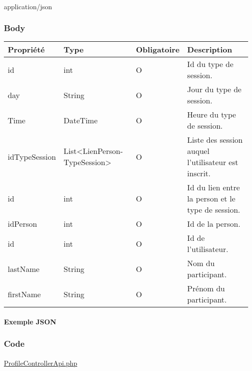 		\paragraph{}
			application/json
	
	\subsubsection{Body}
		\begin{center}
			\begin{tabularx}{\textwidth}{| T{0.2122\textwidth} | S{0.22\textwidth} | S{0.15\textwidth} | S{0.3\textwidth} |}
				\hline
				Propriété & Type & Obligatoire & Description \\
				\hline
				id & int & O & Id du type de session. \\
				\hline
				day & String & O & Jour du type de session. \\
				\hline
				Time & DateTime & O & Heure du type de session. \\
				\hline
				idTypeSession & List<LienPerson- TypeSession> & O & Liste des session auquel l'utilisateur est inscrit. \\
				\hline
				
				\hline
				
				\hline
				id & int & O & Id du lien entre la person et le type de session. \\ 
				\hline
				idPerson & int & O & Id de la person. \\
				\hline
				
				\hline
				
				\hline
				id & int & O & Id de l'utilisateur. \\
				\hline
				lastName & String & O & Nom du participant. \\
				\hline
				firstName & String & O & Prénom du participant. \\
				\hline

			\end{tabularx}
		\end{center}
		
	\newpage
		\paragraph{Exemple JSON}
			\paragraph{}
			
			
			
	\subsubsection{Code}
		\paragraph{}
			\href{https://github.com/victorsmits/Aquabike/blob/master/backend/src/Controller/API/ProfileControllerApi.php}{ProfileControllerApi.php}